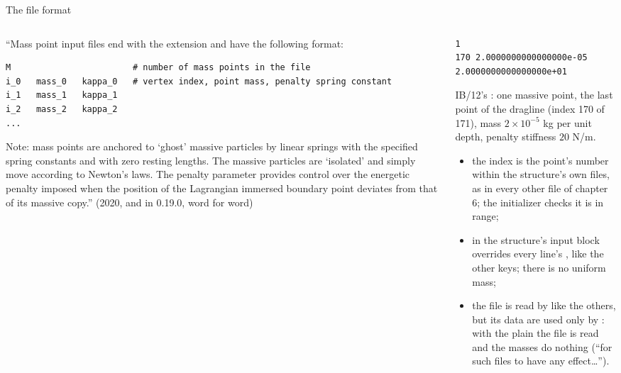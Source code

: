 \documentclass[aspectratio=169,11pt]{beamer}
\begin{document}
\begin{frame}[fragile]{The  file format}
\label{fr:massfile}
\begin{columns}[T,onlytextwidth]
\begin{column}{0.5\textwidth}
\footnotesize ``Mass point input files end with the extension  and have the following format:
\begin{lstlisting}[style=data]
M                        # number of mass points in the file
i_0   mass_0   kappa_0   # vertex index, point mass, penalty spring constant
i_1   mass_1   kappa_1
i_2   mass_2   kappa_2
...
\end{lstlisting}
Note: mass points are anchored to `ghost' massive particles by linear springs with the specified spring constants and with zero resting lengths. The massive particles are `isolated' and simply move according to Newton's laws. The penalty parameter provides control over the energetic penalty imposed when the position of the Lagrangian immersed boundary point deviates from that of its massive copy.'' (2020, and  in 0.19.0, word for word)
\end{column}
\begin{column}{0.48\textwidth}
\begin{lstlisting}[style=data]
1
170 2.0000000000000000e-05 2.0000000000000000e+01
\end{lstlisting}
\footnotesize IB/12's : one massive point, the last point of the dragline (index 170 of 171), mass $2\times10^{-5}$ kg per unit depth, penalty stiffness $20$ N/m.
\begin{itemize}
  \item the index is the point's number within the structure's own files, as in every other file of chapter 6; the initializer checks it is in range;
  \item {} in the structure's input block overrides every line's , like the other  keys; there is no uniform mass;
  \item the file is read by  like the others, but its data are used only by : with the plain  the file is read and the masses do nothing (``for such files to have any effect\ldots'').
\end{itemize}
\end{column}
\end{columns}
\end{frame}
\end{document}
